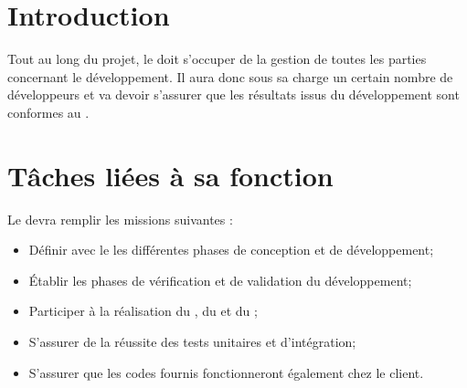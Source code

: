 \documentclass[11pt]{article}
\begin{document}

\section*{Introduction}

Tout au long du projet, le \RD{} doit s'occuper de la gestion de toutes les parties concernant le développement. Il aura donc sous sa charge un certain nombre de développeurs et va devoir s'assurer que les résultats issus du développement sont conformes au \DGQDEUXCourt.

\section*{Tâches liées à sa fonction}

Le \RD{} devra remplir les missions suivantes :
\begin{itemize}
	\item Définir avec le \CP{} les différentes phases de conception et de développement;
	\item Établir les phases de vérification et de validation du développement;

	\item Participer à la réalisation du \DSECourt{}, du \DSICourt{} et du \PTVCourt;

	\item S'assurer de la réussite des tests unitaires et d'intégration;
	\item S'assurer que les codes fournis fonctionneront également chez le client.
\end{itemize}
\end{document}
